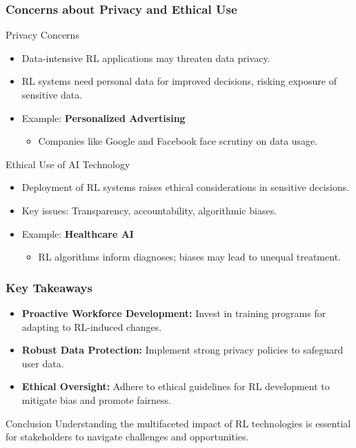 \documentclass[aspectratio=169]{beamer}
\begin{document}
\begin{frame}[fragile]
    \frametitle{Concerns about Privacy and Ethical Use}
    \begin{block}{Privacy Concerns}
        \begin{itemize}
            \item Data-intensive RL applications may threaten data privacy.
            \item RL systems need personal data for improved decisions, risking exposure of sensitive data.
            \item Example: \textbf{Personalized Advertising}
            \begin{itemize}
                \item Companies like Google and Facebook face scrutiny on data usage.
            \end{itemize}
        \end{itemize}
    \end{block}
    \begin{block}{Ethical Use of AI Technology}
        \begin{itemize}
            \item Deployment of RL systems raises ethical considerations in sensitive decisions.
            \item Key issues: Transparency, accountability, algorithmic biases.
            \item Example: \textbf{Healthcare AI}
            \begin{itemize}
                \item RL algorithms inform diagnoses; biases may lead to unequal treatment.
            \end{itemize}
        \end{itemize}
    \end{block}
\end{frame}

\begin{frame}[fragile]
    \frametitle{Key Takeaways}
    \begin{itemize}
        \item \textbf{Proactive Workforce Development:} Invest in training programs for adapting to RL-induced changes.
        \item \textbf{Robust Data Protection:} Implement strong privacy policies to safeguard user data.
        \item \textbf{Ethical Oversight:} Adhere to ethical guidelines for RL development to mitigate bias and promote fairness.
    \end{itemize}
    \begin{block}{Conclusion}
        Understanding the multifaceted impact of RL technologies is essential for stakeholders to navigate challenges and opportunities.
    \end{block}
\end{frame}
\end{document}
